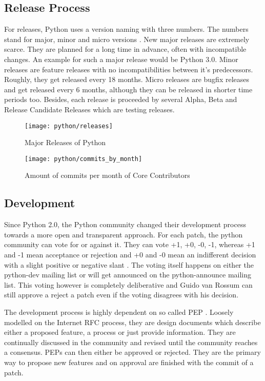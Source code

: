 
\subsection{Release Process} %

For releases, Python uses a version naming with three numbers. The numbers
stand for major, minor and micro versions
\cite{PythonDevelopmentCycle,Warsaw2001}. New major releases are extremely
scarce. They are planned for a long time in advance, often with incompatible
changes. An example for such a major release would be Python 3.0. Minor
releases are feature releases with no incompatibilities between it's
predecessors. Roughly, they get released every 18 months. Micro releases are
bugfix releases and get released every 6 months, although they can be released
in shorter time periods too. Besides, each release is proceeded by several
Alpha, Beta and Release Candidate Releases which are testing releases.

\begin{figure}[htbp]
  \centering
  \texttt{[image: python/releases]}
  \caption{Major Releases of Python}
\end{figure}

\begin{figure}[htbp]
  \centering
  \texttt{[image: python/commits\_by\_month]}
  \caption{Amount of commits per month of Core Contributors}
\end{figure}


\subsection{Development} %

Since Python 2.0, the Python community changed their development process
towards a more open and transparent approach. For each patch, the python
community can vote for or against it. They can vote +1, +0, -0, -1, whereas +1
and -1 mean acceptance or rejection and +0 and -0 mean an indifferent decision
with a slight positive or negative slant \cite{Warsaw2002}. The voting itself
happens on either the python-dev mailing list or will get announced on the
python-announce mailing list. This voting however is completely deliberative
and Guido van Rossum can still approve a reject a patch even if the voting
disagrees with his decision.

The development process is highly dependent on so called \ac{PEP}
\cite{Warsaw2000}. Loosely modelled on the Internet RFC process, they are
design documents which describe either a proposed feature, a process or just
provide information. They are continually discussed in the community and
revised until the community reaches a consensus. \acp{PEP} can then either be
approved or rejected. They are the primary way to propose new features and on
approval are finished with the commit of a patch.

